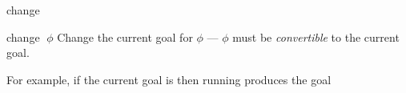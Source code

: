 \begin{tactic}{change}
  \begin{tsyntax}[empty]{change $\;\phi$}
  Change the current goal for $\phi$ --- $\phi$ must be \emph{convertible}
  to the current goal.

  For example, if the current goal is
   then
  running 
  produces the goal
  \end{tsyntax}
\end{tactic}
